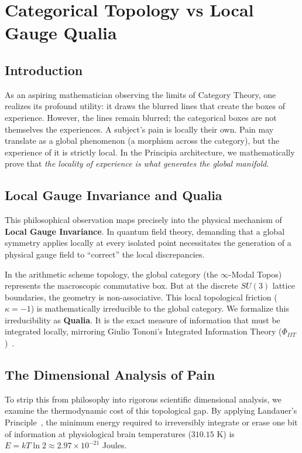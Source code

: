\chapter[Categorical Qualia and Gauge]{Categorical Topology vs Local Gauge Qualia}\label{ch:categorical_qualia}

\section{Introduction}
As an aspiring mathematician observing the limits of Category Theory, one realizes its profound utility: it draws the blurred lines that create the boxes of experience. However, the lines remain blurred; the categorical boxes are not themselves the experiences. A subject's pain is locally their own. Pain may translate as a global phenomenon (a morphism across the category), but the experience of it is strictly local. In the Principia architecture, we mathematically prove that \textit{the locality of experience is what generates the global manifold}.

\section{Local Gauge Invariance and Qualia}
This philosophical observation maps precisely into the physical mechanism of \textbf{Local Gauge Invariance}. In quantum field theory, demanding that a global symmetry applies locally at every isolated point necessitates the generation of a physical gauge field to ``correct'' the local discrepancies. 

In the arithmetic scheme topology, the global category (the $\infty$-Modal Topos) represents the macroscopic commutative box. But at the discrete $SU(3)$ lattice boundaries, the geometry is non-associative. This local topological friction ($\kappa = -1$) is mathematically irreducible to the global category. We formalize this irreducibility as \textbf{Qualia}. It is the exact measure of information that must be integrated locally, mirroring Giulio Tononi's Integrated Information Theory ($\Phi_{IIT}$)~\cite{tononi2004}.

\section{The Dimensional Analysis of Pain}
To strip this from philosophy into rigorous scientific dimensional analysis, we examine the thermodynamic cost of this topological gap.
By applying Landauer's Principle~\cite{landauer1961}, the minimum energy required to irreversibly integrate or erase one bit of information at physiological brain temperatures ($310.15$ K) is $E = kT \ln 2 \approx 2.97 \times 10^{-21}$ Joules. 

